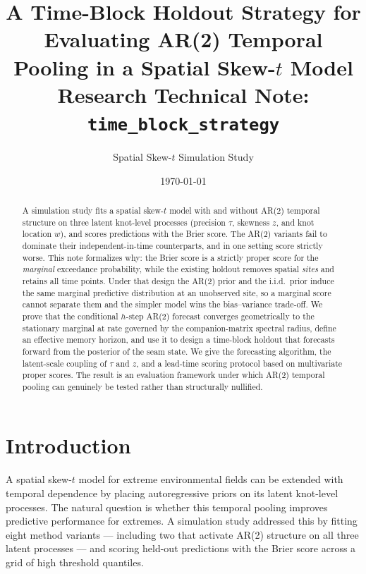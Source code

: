 \documentclass[11pt]{article}
\title{
  A Time-Block Holdout Strategy for Evaluating AR(2)
  Temporal Pooling in a Spatial Skew-$t$ Model\\[4pt]
  \large Research Technical Note: \texttt{time\_block\_strategy}
}
\author{Spatial Skew-$t$ Simulation Study}
\date{\today}
\theoremstyle{definition}
\theoremstyle{remark}
\begin{document}
\maketitle

\begin{abstract}
A simulation study fits a spatial skew-$t$ model with and without
AR(2) temporal structure on three latent knot-level processes
(precision $\tau$, skewness $z$, and knot location $w$), and scores
predictions with the Brier score. The AR(2) variants fail to dominate
their independent-in-time counterparts, and in one setting score
strictly worse. This note formalizes why: the Brier score is a strictly
proper score for the \emph{marginal} exceedance probability, while the
existing holdout removes spatial \emph{sites} and retains all time
points. Under that design the AR(2) prior and the i.i.d.\ prior induce
the same marginal predictive distribution at an unobserved site, so a
marginal score cannot separate them and the simpler model wins the
bias--variance trade-off. We prove that the conditional $h$-step AR(2)
forecast converges geometrically to the stationary marginal at rate
governed by the companion-matrix spectral radius, define an effective
memory horizon, and use it to design a time-block holdout that
forecasts forward from the posterior of the seam state. We give the
forecasting algorithm, the latent-scale coupling of $\tau$ and $z$, and
a lead-time scoring protocol based on multivariate proper scores. The
result is an evaluation framework under which AR(2) temporal pooling can
genuinely be tested rather than structurally nullified.
\end{abstract}

\section{Introduction}
\label{sec:intro}

A spatial skew-$t$ model for extreme environmental fields can be
extended with temporal dependence by placing autoregressive priors on
its latent knot-level processes. The natural question is whether this
temporal pooling improves predictive performance for extremes. A
simulation study addressed this by fitting eight method variants ---
including two that activate AR(2) structure on all three latent
processes --- and scoring held-out predictions with the Brier score
across a grid of high threshold quantiles.
\end{document}
